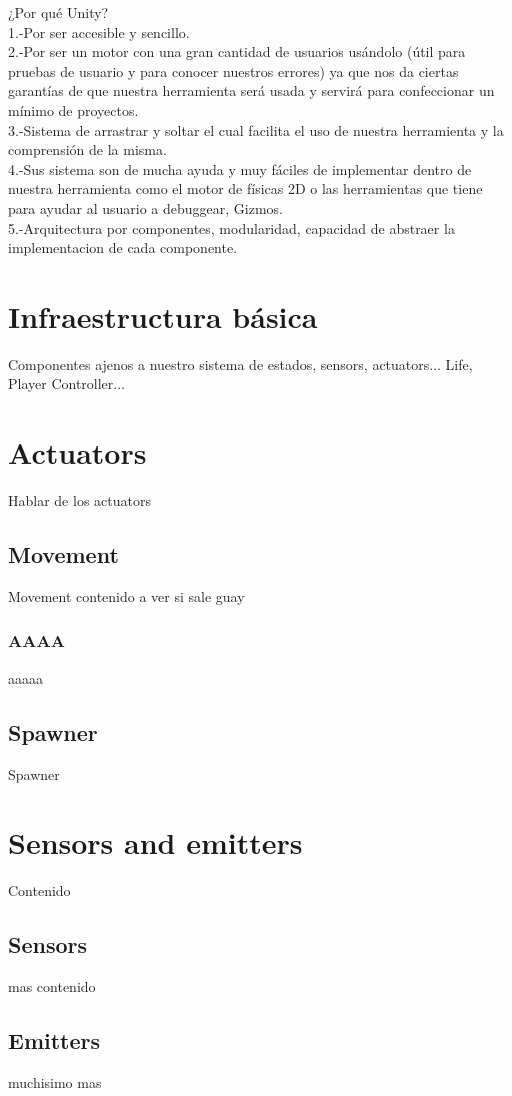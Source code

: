 ¿Por qué Unity?\\
1.-Por ser accesible y sencillo.\\
2.-Por ser un motor con una gran cantidad de usuarios usándolo (útil para pruebas de usuario y para conocer nuestros errores) ya que nos da ciertas garantías de que nuestra herramienta será usada y servirá para confeccionar un mínimo de proyectos.\\
3.-Sistema de arrastrar y soltar el cual facilita el uso de nuestra herramienta y la comprensión de la misma.\\
4.-Sus sistema son de mucha ayuda y muy fáciles de implementar dentro de nuestra herramienta como el motor de físicas 2D o las herramientas que tiene para ayudar al usuario a debuggear, Gizmos.\\
5.-Arquitectura por componentes, modularidad, capacidad de abstraer la implementacion de cada componente.\\

\section{Infraestructura básica}

Componentes ajenos a nuestro sistema de estados, sensors, actuators...
Life, Player Controller...



\section{Actuators}
Hablar de los actuators
\subsection{Movement}
Movement contenido a ver si sale guay
\subsubsection{AAAA}
aaaaa
\subsection{Spawner}
Spawner
\section{Sensors and emitters}
Contenido
\subsection{Sensors}
mas contenido
\subsection{Emitters}
muchisimo mas
